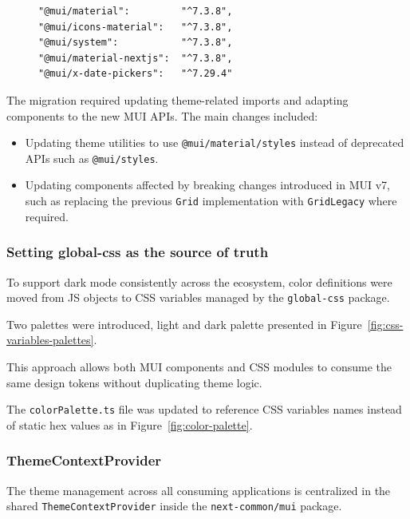 \begin{figure}[h]
    \centering
    \begin{minipage}{0.5\textwidth}
        \begin{lstlisting}[caption={MUI dependencies update}]
"@mui/material":         "^7.3.8",
"@mui/icons-material":   "^7.3.8",
"@mui/system":           "^7.3.8",
"@mui/material-nextjs":  "^7.3.8",
"@mui/x-date-pickers":   "^7.29.4"
        \end{lstlisting}
    \end{minipage}
\end{figure}

The migration required updating theme-related imports and adapting components to the new MUI APIs. The main changes included:

\begin{itemize}
    \item Updating theme utilities to use \lstinline|@mui/material/styles| instead of deprecated APIs such as \lstinline|@mui/styles|.
    \item Updating components affected by breaking changes introduced in MUI v7, such as replacing the previous \lstinline|Grid| implementation with \lstinline|GridLegacy| where required.
\end{itemize}

\subsubsection{Setting \textbf{global-css} as the source of truth}

To support dark mode consistently across the ecosystem, color definitions were moved from \ac{JS} objects to CSS variables managed by the \texttt{global-css} package.

Two palettes were introduced, light and dark palette presented in Figure~\ref{fig:css-variables-palettes}.

This approach allows both MUI components and CSS modules to consume the same design tokens without duplicating theme logic.

The \lstinline|colorPalette.ts| file was updated to reference CSS variables names instead of static hex values as in Figure~\ref{fig:color-palette}.

\subsubsection{{ThemeContextProvider}}

The theme management across all consuming applications is centralized in the shared \texttt{ThemeContextProvider} inside the \texttt{next-common/mui} package.

